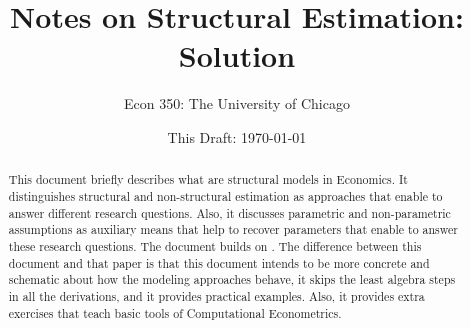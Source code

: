 




\title{\textbf{Notes on Structural Estimation: Solution}}
\author{Econ 350: The University of Chicago}
\date{This Draft: \today}
\maketitle

\begin{abstract}
\noindent This document briefly describes what are structural models in Economics. It distinguishes structural and non-structural estimation as approaches that enable to answer different research questions. Also, it discusses parametric and non-parametric assumptions as auxiliary means that help to recover parameters that enable to answer these research questions. The document builds on \citet{keane2011structural}. The difference between this document and that paper is that this document intends to be more concrete and schematic about how the modeling approaches behave, it skips the least algebra steps in all the derivations, and it provides practical examples. Also, it provides extra exercises that teach basic tools of Computational Econometrics.
\end{abstract}





\clearpage


\clearpage






